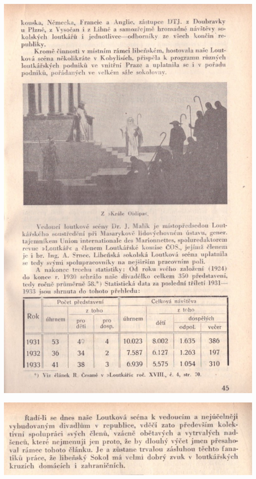 \documentclass[11pt]{article}
\begin{document}
\includegraphics[width=\imagewidth]{original/1934/Skener_20250325 (14).jpg}

\includegraphics[width=\imagewidth]{original/1934/Skener_20250325 (15).jpg}
\end{document}
